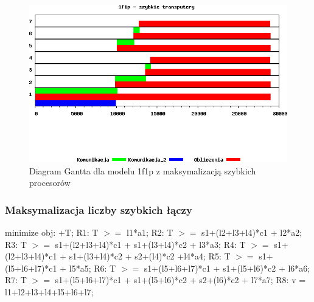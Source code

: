 \documentclass[a4paper,11pt, titlepage]{article}
\begin{document}
\begin{figure}[htp!]
\includegraphics[width=1.0\textwidth]{wykresy/1p1f_proc}
\caption{Diagram Gantta dla modelu 1f1p z maksymalizacją szybkich procesorów \label{1p1f_p}}
\end{figure}
\subsubsection{Maksymalizacja liczby szybkich łączy}
\begin{flushleft}

minimize obj: +T;\linebreak
\linebreak
R1: T $>=$ l1*a1;\linebreak
R2: T $>=$ s1+(l2+l3+l4)*c1 + l2*a2;\linebreak
R3: T $>=$ s1+(l2+l3+l4)*c1 + s1+(l3+l4)*c2 + l3*a3;\linebreak
R4: T $>=$ s1+(l2+l3+l4)*c1 + s1+(l3+l4)*c2 + s2+(l4)*c2 +l4*a4;\linebreak
R5: T $>=$ s1+(l5+l6+l7)*c1 + l5*a5;\linebreak
R6: T $>=$ s1+(l5+l6+l7)*c1 + s1+(l5+l6)*c2 + l6*a6;\linebreak
R7: T $>=$ s1+(l5+l6+l7)*c1 + s1+(l5+l6)*c2 +  s2+(l6)*c2 + l7*a7;\linebreak
R8: v = l1+l2+l3+l4+l5+l6+l7;\linebreak
\end{flushleft}
\end{document}

